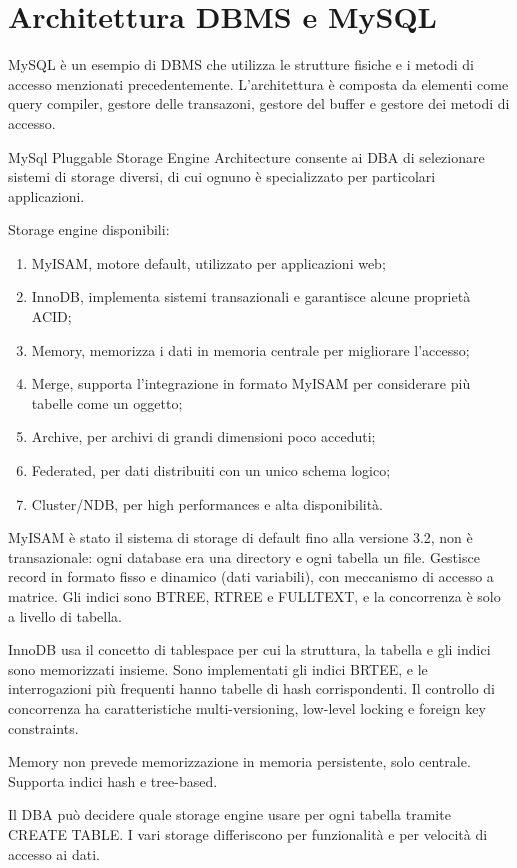 \section{Architettura DBMS e MySQL}
MySQL è un esempio di DBMS che utilizza le strutture fisiche e i metodi di accesso menzionati precedentemente. L'architettura è composta da elementi come query compiler, gestore delle transazoni, gestore del buffer e gestore dei metodi di accesso. 

MySql Pluggable Storage Engine Architecture consente ai DBA di selezionare sistemi di storage diversi, di cui ognuno è specializzato per particolari applicazioni. 

Storage engine disponibili:
\begin{enumerate}
	\item MyISAM, motore default, utilizzato per applicazioni web;
	\item InnoDB, implementa sistemi transazionali e garantisce alcune proprietà ACID;
	\item Memory, memorizza i dati in memoria centrale per migliorare l'accesso;
	\item Merge, supporta l'integrazione in formato MyISAM per considerare più tabelle come un oggetto;
	\item Archive, per archivi di grandi dimensioni poco acceduti;
	\item Federated, per dati distribuiti con un unico schema logico;
	\item Cluster/NDB, per high performances e alta disponibilità.
\end{enumerate}

MyISAM è stato il sistema di storage di default fino alla versione 3.2, non è transazionale: ogni database era una directory e ogni tabella un file. Gestisce record in formato fisso e dinamico (dati variabili), con meccanismo di accesso a matrice. Gli indici sono BTREE, RTREE e FULLTEXT, e la concorrenza è solo a livello di tabella.

InnoDB usa il concetto di tablespace per cui la struttura, la tabella e gli indici sono memorizzati insieme. Sono implementati gli indici BRTEE, e le interrogazioni più frequenti hanno tabelle di hash corrispondenti. Il controllo di concorrenza ha caratteristiche multi-versioning, low-level locking e foreign key constraints.

Memory non prevede memorizzazione in memoria persistente, solo centrale. Supporta indici hash e tree-based.

Il DBA può decidere quale storage engine usare per ogni tabella tramite CREATE TABLE. I vari storage differiscono per funzionalità e per velocità di accesso ai dati. 

